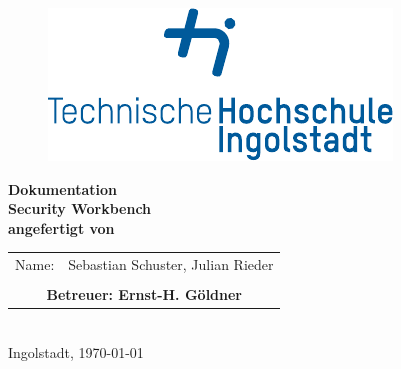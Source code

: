 
\begin{titlepage}

\phantom{tmpText}

\vspace{1cm}

\begin{figure}[h!]
\centering
\includegraphics[width=\textwidth]{bilder/thi_logo_cropped.pdf}
\end{figure}

  \begin{center}

    
    
    \textbf{{\large Dokumentation} \\[3ex]
    {\LARGE Security Workbench} \\[1ex]
    \vfill
    angefertigt von} \\
    \begin{tabular}{ll}
    	 \\
    	Name: & Sebastian Schuster, Julian Rieder\\
    	 \\
    	\multicolumn{2}{c}{\textbf{Betreuer: Ernst-H. Göldner}}\\
    \end{tabular}\\[2ex] %
    \vfill
    Ingolstadt, \today
  \end{center}
\end{titlepage}
